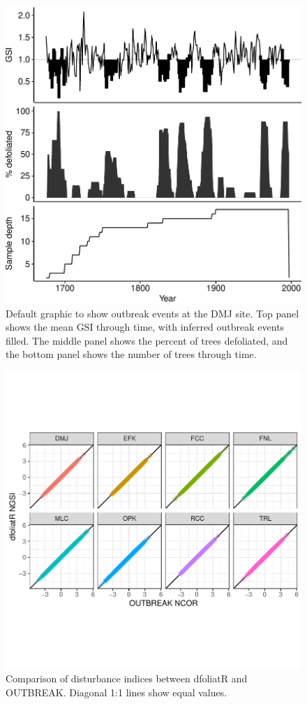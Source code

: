 \documentclass[review]{elsarticle} %
\makeatletter
\def\maxwidth{\ifdim\Gin@nat@width>\linewidth\linewidth
\else\Gin@nat@width\fi}
\let\Oldincludegraphics\includegraphics
\renewcommand{\includegraphics}[1]{\Oldincludegraphics[width=\maxwidth]{#1}}
\makeatother
\begin{document}
\begin{figure}
\centering
\includegraphics{../paper_elsevier/Output/site-plot.pdf}
\caption{\label{fig:fig-obr}Default graphic to show outbreak events at the DMJ site. Top panel shows the mean GSI through time, with inferred outbreak events filled. The middle panel shows the percent of trees defoliated, and the bottom panel shows the number of trees through time.}
\end{figure}

\begin{figure}
\centering
\includegraphics{../paper_elsevier/Output/plot-trees-df-obr.pdf}
\caption{\label{fig:df-obr-1-1}Comparison of disturbance indices between dfoliatR and OUTBREAK. Diagonal 1:1 lines show equal values.}
\end{figure}
\end{document}
